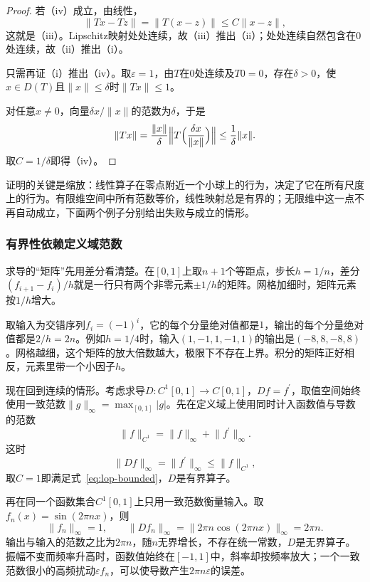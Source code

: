 \begin{proof}
若（iv）成立，由线性，
\[
 \lVert Tx-Tz\rVert=\lVert T(x-z)\rVert\leq C\lVert x-z\rVert,
\]
这就是（iii）。Lipschitz映射处处连续，故（iii）推出（ii）；处处连续自然包含在$0$处连续，故（ii）推出（i）。

只需再证（i）推出（iv）。取$\varepsilon=1$，由$T$在$0$处连续及$T0=0$，存在$\delta>0$，使$x\in D(T)$且$\lVert x\rVert\leq\delta$时$\lVert Tx\rVert\leq1$。

对任意$x\neq0$，向量$\delta x/\lVert x\rVert$的范数为$\delta$，于是
\[
 \lVert Tx\rVert=\frac{\lVert x\rVert}{\delta}\Bigl\lVert T\Bigl(\frac{\delta x}{\lVert x\rVert}\Bigr)\Bigr\rVert\leq\frac{1}{\delta}\lVert x\rVert .
\]
取$C=1/\delta$即得（iv）。
\end{proof}

证明的关键是缩放：线性算子在零点附近一个小球上的行为，决定了它在所有尺度上的行为。有限维空间中所有范数等价，线性映射总是有界的；无限维中这一点不再自动成立，下面两个例子分别给出失败与成立的情形。

\subsubsection{有界性依赖定义域范数}
\label{sec:lop-derivative-boundedness}

求导的“矩阵”先用差分看清楚。在$[0,1]$上取$n+1$个等距点，步长$h=1/n$，差分$(f_{i+1}-f_i)/h$就是一行只有两个非零元素$\pm1/h$的矩阵。网格加细时，矩阵元素按$1/h$增大。

取输入为交错序列$f_i=(-1)^i$，它的每个分量绝对值都是$1$，输出的每个分量绝对值都是$2/h=2n$。例如$h=1/4$时，输入$(1,-1,1,-1,1)$的输出是$(-8,8,-8,8)$。网格越细，这个矩阵的放大倍数越大，极限下不存在上界。积分的矩阵正好相反，元素里带一个小因子$h$。

现在回到连续的情形。考虑求导$D:C^1[0,1]\to C[0,1]$，$Df=f^\prime$，取值空间始终使用一致范数$\lVert g\rVert_\infty=\max_{[0,1]}\lvert g\rvert$。先在定义域上使用同时计入函数值与导数的范数
\[
 \lVert f\rVert_{C^1}=\lVert f\rVert_\infty+\lVert f^\prime\rVert_\infty .
\]
这时
\[
 \lVert Df\rVert_\infty=\lVert f^\prime\rVert_\infty\leq\lVert f\rVert_{C^1},
\]
取$C=1$即满足式~\eqref{eq:lop-bounded}，$D$是有界算子。

再在同一个函数集合$C^1[0,1]$上只用一致范数衡量输入。取$f_n(x)=\sin(2\pi nx)$，则
\[
 \lVert f_n\rVert_\infty=1,\qquad \lVert Df_n\rVert_\infty=\lVert2\pi n\cos(2\pi nx)\rVert_\infty=2\pi n .
\]
输出与输入的范数之比为$2\pi n$，随$n$无界增长，不存在统一常数，$D$是无界算子。振幅不变而频率升高时，函数值始终在$[-1,1]$中，斜率却按频率放大；一个一致范数很小的高频扰动$\varepsilon f_n$，可以使导数产生$2\pi n\varepsilon$的误差。

